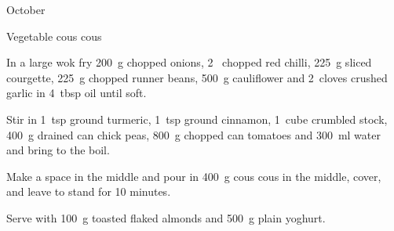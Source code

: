 \begin{menu}{October}
\begin{recipe}{2}{Vegetable cous cous}
    \begin{instructions}
    \item 
        In a large wok fry
        200~g chopped onions,
        2~ chopped red chilli,
        225~g sliced courgette,
        225~g chopped runner beans,
        500~g  cauliflower
        and
        2~cloves crushed garlic
        in
        4~tbsp  oil
        until soft.
      \item 
        Stir in
        1~tsp  ground turmeric,
        1~tsp  ground cinnamon,
        1~cube crumbled stock,
        400~g drained can chick peas,
        800~g chopped can tomatoes
        and
        300~ml  water
        and bring to the boil.
      \item 
        Make a space in the middle and pour in
        400~g  cous cous
        in the middle, cover,
        and leave to stand for 10 minutes.
      \item 
        Serve with
        100~g toasted flaked almonds
        and
        500~g  plain yoghurt.
      
    \end{instructions}
    \end{recipe}%
  
    \clearpage
    \end{menu}
	

